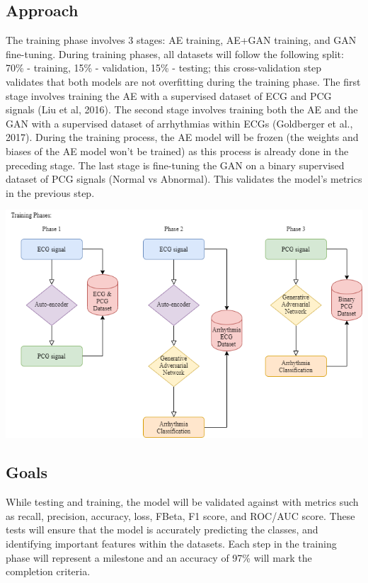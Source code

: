 \documentclass{article}
\begin{document}
\subsection{Approach}
The training phase involves 3 stages: AE training, AE+GAN training, and GAN fine-tuning. During training phases, all datasets will follow the following split: 70\% - training, 15\% - validation, 15\% - testing; this cross-validation step validates that both models are not overfitting during the training phase. The first stage involves training the AE with a supervised dataset of ECG and PCG signals (Liu et al, 2016). The second stage involves training both the AE and the GAN with a supervised dataset of arrhythmias within ECGs (Goldberger et al., 2017). During the training process, the AE model will be frozen (the weights and biases of the AE model won't be trained) as this process is already done in the preceding stage. The last stage is fine-tuning the GAN  on a binary supervised dataset of PCG signals (Normal vs Abnormal). This validates the model's metrics in the previous step.  
\begin{center}
    \includegraphics[scale=0.70]{training-digram}
\end{center}

\subsection{Goals}
While testing and training, the model will be validated against with metrics such as recall, precision, accuracy, loss, FBeta, F1 score, and ROC/AUC score. These tests will ensure that the model is accurately predicting the classes, and identifying important features within the datasets. Each step in the training phase will represent a milestone and an accuracy of 97\% will mark the completion criteria.
\end{document}
